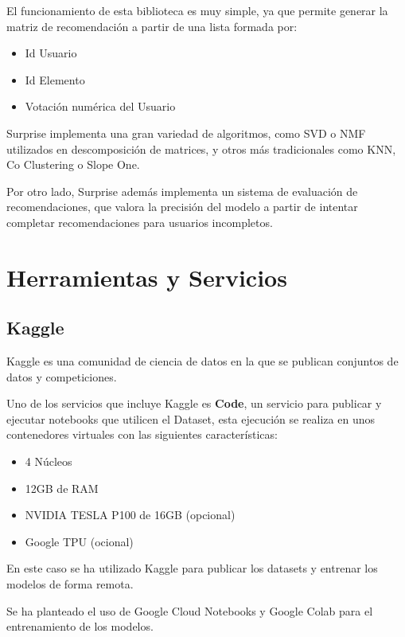 El funcionamiento de esta biblioteca es muy simple, ya que permite
generar la matriz de recomendación a partir de una lista formada por:

\begin{itemize}
\item
  Id Usuario
\item
  Id Elemento
\item
  Votación numérica del Usuario
\end{itemize}

Surprise implementa una gran variedad de algoritmos, como SVD o NMF
utilizados en descomposición de matrices, y otros más tradicionales como
KNN, Co Clustering o Slope One.

Por otro lado, Surprise además implementa un sistema de evaluación de
recomendaciones, que valora la precisión del modelo a partir de intentar
completar recomendaciones para usuarios incompletos.

\hypertarget{herramientas-y-servicios}{%
\section{Herramientas y Servicios}\label{herramientas-y-servicios}}

\hypertarget{kaggle}{%
\subsection{Kaggle}\label{kaggle}}

Kaggle es una comunidad de ciencia de datos en la que se publican
conjuntos de datos y competiciones.

Uno de los servicios que incluye Kaggle es \textbf{Code}, un servicio
para publicar y ejecutar notebooks que utilicen el Dataset, esta
ejecución se realiza en unos contenedores virtuales con las siguientes
características:

\begin{itemize}
\item
  4 Núcleos
\item
  12GB de RAM
\item
  NVIDIA TESLA P100 de 16GB (opcional)
\item
  Google TPU (ocional)
\end{itemize}

En este caso se ha utilizado Kaggle para publicar los datasets y
entrenar los modelos de forma remota.

Se ha planteado el uso de Google Cloud Notebooks y Google Colab para el
entrenamiento de los modelos.


